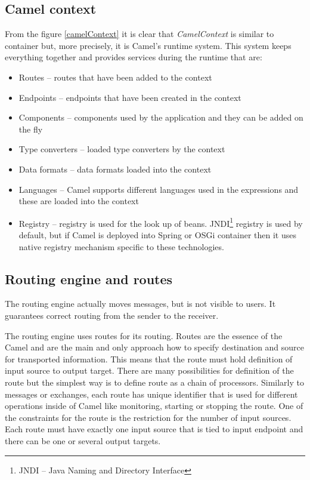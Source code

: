 \documentclass[12pt,final,oneside]{fithesis2}
\begin{document}
\subsection*{Camel context}
From the figure \ref{camelContext} it is clear that \textit{CamelContext} is similar to container but, more precisely, it is Camel's runtime system. This system keeps everything together and provides services during the runtime that are:
\begin{itemize}
\item
Routes -- routes that have been added to the context

\item
Endpoints -- endpoints that have been created in the context

\item
Components -- components used by the application and they can be added on the fly

\item
Type converters -- loaded type converters by the context

\item
Data formats -- data formats loaded into the context

\item
Languages -- Camel supports different languages used in the expressions and these are loaded into the context

\item
Registry -- registry is used for the look up of beans. JNDI\footnote{JNDI -- Java Naming and Directory Interface} registry is used by default, but if Camel is deployed into Spring or OSGi container then it uses native registry mechanism specific to these technologies.

\end{itemize}

\subsection*{Routing engine and routes}
The routing engine actually moves messages, but is not visible to users. It guarantees correct routing from the sender to the receiver.

The routing engine uses routes for its routing. Routes are the essence of the Camel and are the main and only approach how to specify destination and source for transported information. This means that the route must hold definition of input source to output target. There are many possibilities for definition of the route but the simplest way is to define route as a chain of processors\cite{camel-in-action}. Similarly to messages or exchanges, each route has unique identifier that is used for different operations inside of Camel like monitoring, starting or stopping the route. One of the constraints for the route is the restriction for the number of input sources. Each route must have exactly one input source that is tied to input endpoint and there can be one or several output targets.
\end{document}
